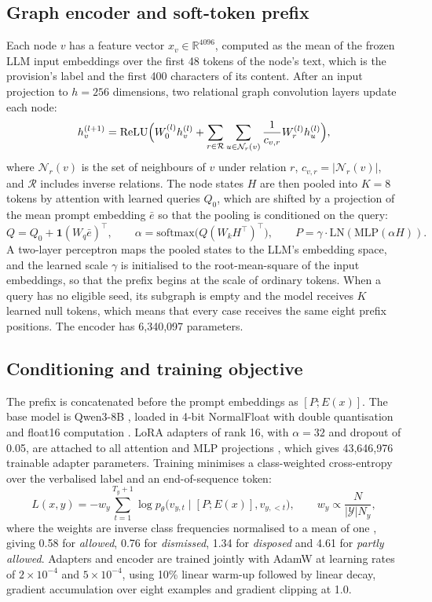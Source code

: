 \documentclass[11pt,a4paper]{article}
\newcommand{\cls}[1]{\emph{#1}}
\begin{document}
\subsection{Graph encoder and soft-token prefix}
Each node $v$ has a feature vector $x_v\in\mathbb{R}^{4096}$, computed as the mean of the frozen LLM input embeddings over the first 48 tokens of the node's text, which is the provision's label and the first 400 characters of its content. After an input projection to $h=256$ dimensions, two relational graph convolution layers \cite{r32} update each node:
\begin{equation}
h_v^{(l+1)}=\mathrm{ReLU}\Bigl(W_0^{(l)}h_v^{(l)}+\sum_{r\in\mathcal{R}}\sum_{u\in\mathcal{N}_r(v)}\frac{1}{c_{v,r}}W_r^{(l)}h_u^{(l)}\Bigr),
\end{equation}
where $\mathcal{N}_r(v)$ is the set of neighbours of $v$ under relation $r$, $c_{v,r}=|\mathcal{N}_r(v)|$, and $\mathcal{R}$ includes inverse relations. The node states $H$ are then pooled into $K=8$ tokens by attention with learned queries $Q_0$, which are shifted by a projection of the mean prompt embedding $\bar e$ so that the pooling is conditioned on the query:
\begin{equation}
Q=Q_0+\mathbf{1}(W_q\bar e)^\top,\qquad \alpha=\mathrm{softmax}\bigl(Q(W_kH^\top)^\top\bigr),\qquad P=\gamma\cdot\mathrm{LN}(\mathrm{MLP}(\alpha H)).
\end{equation}
A two-layer perceptron maps the pooled states to the LLM's embedding space, and the learned scale $\gamma$ is initialised to the root-mean-square of the input embeddings, so that the prefix begins at the scale of ordinary tokens. When a query has no eligible seed, its subgraph is empty and the model receives $K$ learned null tokens, which means that every case receives the same eight prefix positions. The encoder has 6,340,097 parameters.

\subsection{Conditioning and training objective}
The prefix is concatenated before the prompt embeddings as $[P;E(x)]$. The base model is Qwen3-8B \cite{r59}, loaded in 4-bit NormalFloat with double quantisation and float16 computation \cite{r14}. LoRA adapters of rank 16, with $\alpha=32$ and dropout of 0.05, are attached to all attention and MLP projections \cite{r13}, which gives 43,646,976 trainable adapter parameters. Training minimises a class-weighted cross-entropy over the verbalised label and an end-of-sequence token:
\begin{equation}
L(x,y)=-w_y\sum_{t=1}^{T_y+1}\log p_\theta\bigl(v_{y,t}\mid[P;E(x)],v_{y,<t}\bigr),\qquad w_y\propto\frac{N}{|\mathcal{Y}|N_y},
\end{equation}
where the weights are inverse class frequencies normalised to a mean of one \cite{r60}, giving 0.58 for \cls{allowed}, 0.76 for \cls{dismissed}, 1.34 for \cls{disposed} and 4.61 for \cls{partly allowed}. Adapters and encoder are trained jointly with AdamW at learning rates of $2\times10^{-4}$ and $5\times10^{-4}$, using 10\% linear warm-up followed by linear decay, gradient accumulation over eight examples and gradient clipping at 1.0.
\end{document}
